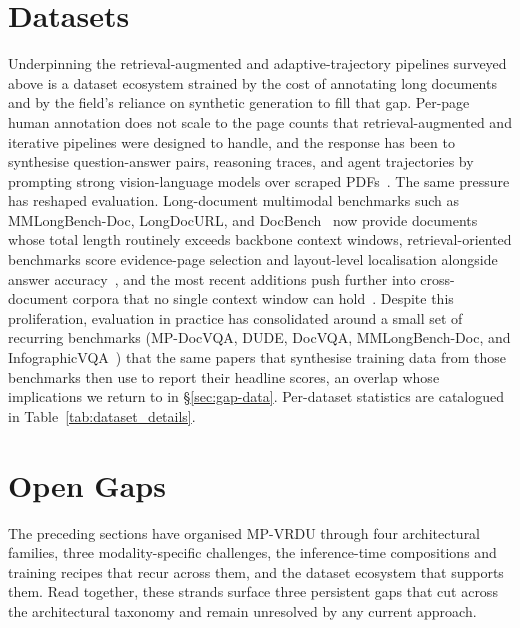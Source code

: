 \documentclass[11pt]{article}
\begin{document}
\section{Datasets}
\label{sec:datasets}
Underpinning the retrieval-augmented and adaptive-trajectory pipelines surveyed above is a dataset ecosystem strained by the cost of annotating long documents and by the field's reliance on synthetic generation to fill that gap. Per-page human annotation does not scale to the page counts that retrieval-augmented and iterative pipelines were designed to handle, and the response has been to synthesise question-answer pairs, reasoning traces, and agent trajectories by prompting strong vision-language models over scraped PDFs~\cite{xie2024wukong,tanaka2025vdocrag,wu2025molorag,zhang2026docdancer,guo2026endtoend}. The same pressure has reshaped evaluation. Long-document multimodal benchmarks such as MMLongBench-Doc, LongDocURL, and DocBench~\cite{ma2024mmlongbenchdoc,deng2025longdocurl,zou2024docbench} now provide documents whose total length routinely exceeds backbone context windows, retrieval-oriented benchmarks score evidence-page selection and layout-level localisation alongside answer accuracy~\cite{hui2024uda,xiong2026docr1,zhu2025doclens}, and the most recent additions push further into cross-document corpora that no single context window can hold~\cite{cho2024m3docrag,wang2025vidorag,suri2025visdom}. Despite this proliferation, evaluation in practice has consolidated around a small set of recurring benchmarks (MP-DocVQA, DUDE, DocVQA, MMLongBench-Doc, and InfographicVQA~\cite{tito2023hierarchical,vanlandeghem2023document,mathew2021docvqa,mathew2022infographicvqa}) that the same papers that synthesise training data from those benchmarks then use to report their headline scores, an overlap whose implications we return to in \S\ref{sec:gap-data}. Per-dataset statistics are catalogued in Table~\ref{tab:dataset_details}.



\section{Open Gaps}
\label{sec:gaps}

The preceding sections have organised MP-VRDU through four architectural families, three modality-specific challenges, the inference-time compositions and training recipes that recur across them, and the dataset ecosystem that supports them. Read together, these strands surface three persistent gaps that cut across the architectural taxonomy and remain unresolved by any current approach.
\end{document}
